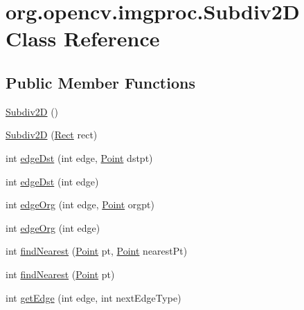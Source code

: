 \hypertarget{classorg_1_1opencv_1_1imgproc_1_1_subdiv2_d}{}\section{org.\+opencv.\+imgproc.\+Subdiv2D Class Reference}
\label{classorg_1_1opencv_1_1imgproc_1_1_subdiv2_d}
\subsection*{Public Member Functions}
\begin{DoxyCompactItemize}
\item 
\mbox{\hyperlink{classorg_1_1opencv_1_1imgproc_1_1_subdiv2_d_ae9146884810c532d8a7869efb6cd91ea}{Subdiv2D}} ()
\item 
\mbox{\hyperlink{classorg_1_1opencv_1_1imgproc_1_1_subdiv2_d_ac113aca459a341c83020d016fee23bb9}{Subdiv2D}} (\mbox{\hyperlink{classorg_1_1opencv_1_1core_1_1_rect}{Rect}} rect)
\item 
int \mbox{\hyperlink{classorg_1_1opencv_1_1imgproc_1_1_subdiv2_d_ace23bc9d8c745e4153366e7050f3f61d}{edge\+Dst}} (int edge, \mbox{\hyperlink{classorg_1_1opencv_1_1core_1_1_point}{Point}} dstpt)
\item 
int \mbox{\hyperlink{classorg_1_1opencv_1_1imgproc_1_1_subdiv2_d_a7755ad8fcb9c0b5a4a6eda9415b0d8f1}{edge\+Dst}} (int edge)
\item 
int \mbox{\hyperlink{classorg_1_1opencv_1_1imgproc_1_1_subdiv2_d_abc54b2a9d95aac6f4e3f5851103afa35}{edge\+Org}} (int edge, \mbox{\hyperlink{classorg_1_1opencv_1_1core_1_1_point}{Point}} orgpt)
\item 
int \mbox{\hyperlink{classorg_1_1opencv_1_1imgproc_1_1_subdiv2_d_a85f94b9e5e650132e36122ecb0988149}{edge\+Org}} (int edge)
\item 
int \mbox{\hyperlink{classorg_1_1opencv_1_1imgproc_1_1_subdiv2_d_a162c34979523383534b32c283b1597d3}{find\+Nearest}} (\mbox{\hyperlink{classorg_1_1opencv_1_1core_1_1_point}{Point}} pt, \mbox{\hyperlink{classorg_1_1opencv_1_1core_1_1_point}{Point}} nearest\+Pt)
\item 
int \mbox{\hyperlink{classorg_1_1opencv_1_1imgproc_1_1_subdiv2_d_ad5c21858191527c8650aeab2203aa8ab}{find\+Nearest}} (\mbox{\hyperlink{classorg_1_1opencv_1_1core_1_1_point}{Point}} pt)
\item 
int \mbox{\hyperlink{classorg_1_1opencv_1_1imgproc_1_1_subdiv2_d_a604a0ffdd5341dcc756594d81cfc5f7f}{get\+Edge}} (int edge, int next\+Edge\+Type)

\end{DoxyCompactItemize}
